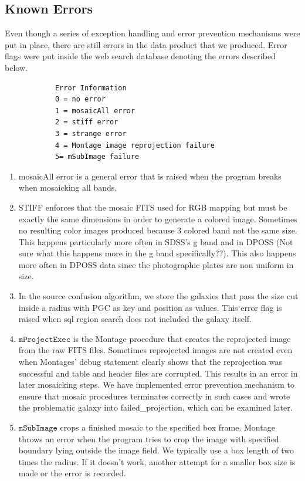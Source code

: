 \documentclass[5p]{elsarticle}
\begin{document}
	\subsection{Known Errors}
	Even though a series of exception handling and error prevention mechanisms were put in place,  there are still errors in the data product that we produced. Error flags were put inside the web search database denoting the errors described below.
	\begin{verbatim}
			Error Information
			0 = no error
			1 = mosaicAll error
			2 = stiff error 
			3 = strange error
			4 = Montage image reprojection failure
			5= mSubImage failure
	\end{verbatim}
	 	\begin{enumerate}
	 	\item  mosaicAll error is a general error that is raised when the program breaks when mosaicking all bands.
	 	\item  STIFF  enforces that the mosaic FITS used for RGB mapping but must be exactly the same dimensions in order to generate a colored image. Sometimes no resulting color images produced because 3 colored band not the same size. This happens particularly more often in SDSS's g band and in DPOSS (Not sure what this happens more in the g band specifically??). This also happens more often in DPOSS data since the photographic plates are non uniform in size. 
	 	\item  In the source confusion algorithm, we store the galaxies that pass the size cut inside a radius with PGC as key and position as values. This error flag is raised when sql region search does not included the galaxy itself. 
	 	\item  $\texttt{mProjectExec}$ is the Montage procedure that creates the reprojected image from the raw FITS files. Sometimes reprojected images are not created even when Montages' debug statement clearly shows that the reprojection was successful and table and header files are corrupted. This results in an error in later mosaicking steps. We have implemented error prevention mechanism to ensure that mosaic procedures terminates correctly in such cases and wrote the problematic galaxy into failed\_projection, which can be examined later. 
	 	\item  $\texttt{mSubImage}$ crops a finished mosaic to the specified box frame. Montage throws an error when the program tries to crop the image with specified boundary lying outside the image field. We typically use a box length of two times the radius. If it doesn't work, another attempt for a smaller box size is made or the error is recorded. 
	 	\end{enumerate}	 
\end{document}
